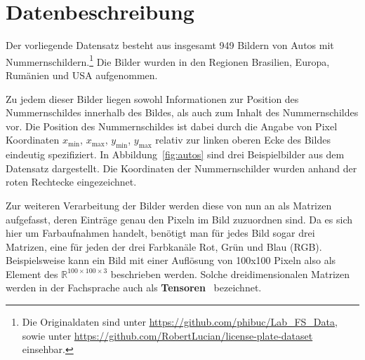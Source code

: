 \section{Datenbeschreibung}
\label{sec:Datenbeschreibung}

Der vorliegende Datensatz besteht aus insgesamt 949 Bildern von Autos mit
Nummernschildern.\footnote{Die Originaldaten sind unter \url{https://github.com/phibuc/Lab_FS_Data},
    sowie unter \url{https://github.com/RobertLucian/license-plate-dataset}
    einsehbar.}
Die Bilder wurden in den Regionen Brasilien, Europa, Rum\"anien und USA
aufgenommen.

Zu jedem dieser Bilder liegen sowohl Informationen zur Position
des Nummernschildes innerhalb des Bildes, als auch zum
Inhalt des Nummernschildes vor.
Die Position des Nummernschildes ist dabei durch die Angabe von Pixel Koordinaten
$x_{\text{min}}$, $x_{\text{max}}$, $y_{\text{min}}$, $y_{\text{max}}$
relativ zur linken oberen Ecke des Bildes eindeutig spezifiziert.
In Abbildung~\ref{fig:autos} sind drei Beispielbilder aus dem Datensatz
dargestellt. Die Koordinaten der Nummernschilder wurden anhand der
roten Rechtecke eingezeichnet.

Zur weiteren Verarbeitung der Bilder werden diese von nun an als Matrizen
aufgefasst, deren Eintr\"age genau den Pixeln im Bild zuzuordnen sind.
Da es sich hier um Farbaufnahmen handelt, ben\"otigt man f\"ur jedes
Bild sogar drei Matrizen, eine f\"ur jeden der drei Farbkan\"ale
Rot, Gr\"un und Blau (RGB).
Beispielsweise kann ein Bild mit einer Aufl\"osung von 100x100 Pixeln also
als Element des $\mathbb{R}^{100 \times 100 \times 3}$ beschrieben werden.
Solche \glqq dreidimensionalen Matrizen\grqq{} werden in der
Fachsprache auch als
\textbf{Tensoren}~\cite{Goodfellow-et-al-2016} bezeichnet.


